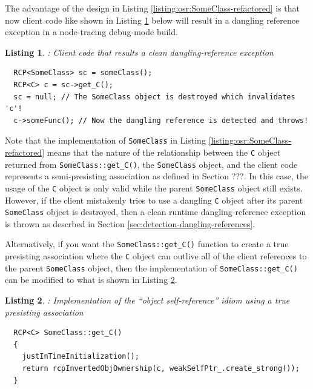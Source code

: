 \documentclass[pdf,ps2pdf,11pt]{SANDreport}
\newtheorem{listing}{Listing}
\begin{document}
The advantage of the design in Listing
{}\ref{listing:osr:SomeClass-refactored} is that now client code like
shown in Listing {}\ref{listing:osr:dangling-ref-SomeClass} below will
result in a dangling reference exception in a node-tracing debug-mode
build.


\begin{listing}: Client code that results a clean dangling-reference exception  \\
\label{listing:osr:dangling-ref-SomeClass}
{\small\begin{verbatim}
  RCP<SomeClass> sc = someClass();
  RCP<C> c = sc->get_C();
  sc = null; // The SomeClass object is destroyed which invalidates 'c'!
  c->someFunc(); // Now the dangling reference is detected and throws!
\end{verbatim}}
\end{listing}


Note that the implementation of {}\texttt{SomeClass} in Listing
{}\ref{listing:osr:SomeClass-refactored} means that the nature of the
relationship between the {}\texttt{C} object returned from
{}\texttt{SomeClass::get\_C()}, the {}\texttt{SomeClass} object, and
the client code represents a semi-presisting association as defined in
Section ???.  In this case, the usage of the {}\texttt{C} object is
only valid while the parent {}\texttt{SomeClass} object still exists.
However, if the client mistakenly tries to use a dangling {}\texttt{C}
object after its parent {}\texttt{SomeClass} object is destroyed, then
a clean runtime dangling-reference exception is thrown as descrbed in
Section {}\ref{sec:detection-dangling-references}.

Alternatively, if you want the {}\texttt{SomeClass::get\_C()} function
to create a true presisting association where the {}\texttt{C} object
can outlive all of the client references to the parent
{}\texttt{SomeClass} object, then the implementation of
{}\texttt{SomeClass::get\_C()} can be modified to what is shown in
Listing {}\ref{listing:osr:SomeClass-get_C-persisting}.


\begin{listing}:  Implementation of the ``object self-reference'' idiom
using a true presisting association  \\
\label{listing:osr:SomeClass-get_C-persisting}
{\small\begin{verbatim}
  RCP<C> SomeClass::get_C()
  {
    justInTimeInitialization();
    return rcpInvertedObjOwnership(c, weakSelfPtr_.create_strong());
  }
\end{verbatim}}
\end{listing}
\end{document}
